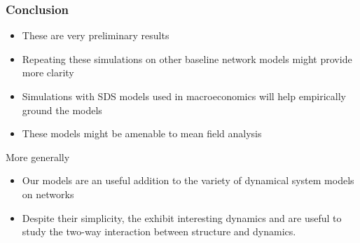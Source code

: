 \documentclass{beamer}
\begin{document}
\begin{frame}[t]
\frametitle{Conclusion}
\begin{itemize}
\item These are very preliminary results 
\item Repeating these simulations on other baseline network models might provide more clarity
\item Simulations with SDS models used in macroeconomics will help empirically ground the models  
\item These models might be amenable to mean field analysis 
\end{itemize}
More generally
\begin{itemize}
\item Our models are an useful addition to the variety of dynamical system models on networks 
\item Despite their simplicity, the exhibit interesting dynamics and are useful to study the two-way interaction between structure and dynamics.  
\end{itemize}
\end{frame}
\end{document}
